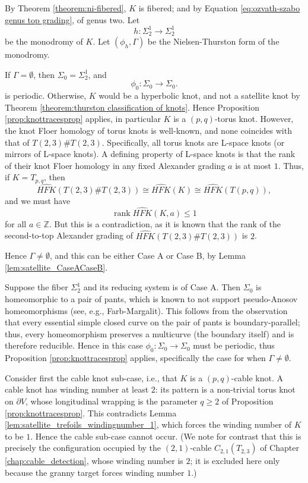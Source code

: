 \begin{myproof}
    By Theorem \ref{theorem:ni-fibered}, $K$ is fibered; and by Equation \ref{eq:ozvath-szabo genus top grading}, of genus two. Let
    \[
    h \colon \Sigma_2^1 \to \Sigma_2^1
    \]
    be the monodromy of $K$. Let $(\phi_h,\Gamma)$ be the Nielsen-Thurston form of the monodromy.

    If $\Gamma = \emptyset$, then $\Sigma_0 = \Sigma_2^1$, and
    \[
    \phi_0 \colon \Sigma_0 \to \Sigma_0.
    \]
    is periodic. Otherwise, $K$ would be a hyperbolic knot, and not a satellite knot by Theorem \ref{theorem:thurston classification of knots}. Hence Proposition \ref{prop:knottracesprop} applies, in particular $K$ is a $(p,q)$-torus knot. However, the knot Floer homology of torus knots is well-known, and none coincides with that of $T(2,3) \# T(2,3)$. Specifically, all torus knots are L-space knots (or mirrors of L-space knots). A defining property of L-space knots is that the rank of their knot Floer homology in any fixed Alexander grading $a$ is at most $1$. Thus, if $K = T_{p,q}$, then
    \[
    \widehat{HFK}(T(2,3)\#T(2,3)) \cong \widehat{HFK}(K) \cong \widehat{HFK}(T(p,q)),
    \]
    and we must have
    \[
    \operatorname{rank} \widehat{HFK}(K, a) \le 1
    \]
    for all $a \in \mathbb{Z}$. But this is a contradiction, as it is known that the rank of the second-to-top Alexander grading of $\widehat{HFK}(T(2,3)\#T(2,3))$ is $2$.

    Hence $\Gamma \neq \emptyset$, and this can be either Case A or Case B, by Lemma \ref{lem:satellite_CaseACaseB}.

    Suppose the fiber $\Sigma_2^1$ and its reducing system is of Case A. Then $\Sigma_0$ is homeomorphic to a pair of pants, which is known to not support pseudo-Anosov homeomorphisms (see, e.g., Farb-Margalit\cite{farb2012primer}). This follows from the observation that every essential simple closed curve on the pair of pants is boundary-parallel; thus, every homeomorphism preserves a multicurve (the boundary itself) and is therefore reducible. Hence in this case $\phi_0 \colon \Sigma_0 \to \Sigma_0$ must be periodic, thus Proposition \ref{prop:knottracesprop} applies, specifically the case for when $\Gamma \neq \emptyset$.

    Consider first the cable knot sub-case, i.e., that $K$ is a $(p,q)$-cable knot. A cable knot has winding number at least $2$: its pattern is a non-trivial torus knot on $\partial V$, whose longitudinal wrapping is the parameter $q \geq 2$ of Proposition \ref{prop:knottracesprop}. This contradicts Lemma \ref{lem:satellite_trefoils_windingnumber_1}, which forces the winding number of $K$ to be $1$. Hence the cable sub-case cannot occur. (We note for contrast that this is precisely the configuration occupied by the $(2,1)$-cable $C_{2,1}(T_{2,3})$ of Chapter \ref{chap:cable_detection}, whose winding number is $2$; it is excluded here only because the granny target forces winding number $1$.)


\end{myproof}
